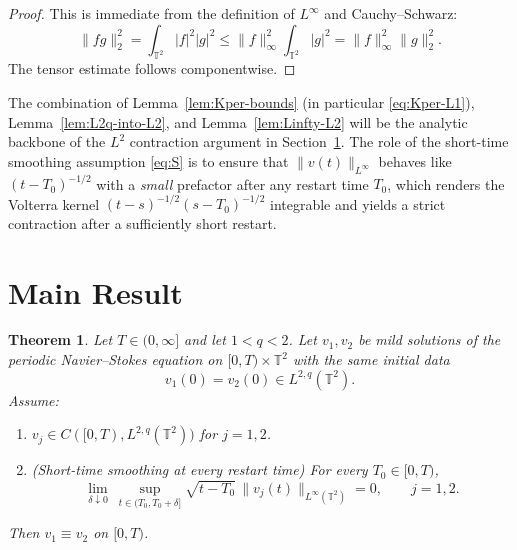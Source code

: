 \documentclass[12pt]{article}
\newcommand{\T}{\mathbb{T}}
\newtheorem{theorem}{Theorem}[section]
\theoremstyle{remark}
\theoremstyle{remark}
\begin{document}
\begin{proof}
This is immediate from the definition of $L^\infty$ and Cauchy--Schwarz:
\[
\|fg\|_2^2=\int_{\T^2}|f|^2|g|^2\le \|f\|_\infty^2\int_{\T^2}|g|^2=\|f\|_\infty^2\|g\|_2^2.
\]
The tensor estimate follows componentwise.
\end{proof}

\medskip

The combination of Lemma~\ref{lem:Kper-bounds} (in particular \eqref{eq:Kper-L1}),
Lemma~\ref{lem:L2q-into-L2}, and Lemma~\ref{lem:Linfty-L2} will be the analytic backbone of the
$L^2$ contraction argument in Section~\ref{sec:main}. The role of the short-time smoothing assumption
\eqref{eq:S} is to ensure that $\|v(t)\|_{L^\infty}$ behaves like $(t-T_0)^{-1/2}$ with a \emph{small}
prefactor after any restart time $T_0$, which renders the Volterra kernel
$(t-s)^{-1/2}(s-T_0)^{-1/2}$ integrable and yields a strict contraction after a sufficiently short restart.


\section{Main Result}\label{sec:main}

\begin{theorem}\label{main}
Let $T\in(0,\infty]$ and let $1<q<2$. Let $v_1,v_2$ be mild solutions of the periodic Navier--Stokes equation on
$[0,T)\times\mathbb T^2$ with the same initial data
\[
v_1(0)=v_2(0)\in L^{2,q}(\mathbb T^2).
\]
Assume:
\begin{enumerate}
\item $v_j\in C([0,T),L^{2,q}(\mathbb T^2))$ for $j=1,2$.
\item (Short-time smoothing at every restart time) For every $T_0\in[0,T)$,
\begin{equation}\label{eq:S}
\lim_{\delta\downarrow 0}\ \sup_{t\in(T_0,T_0+\delta]}
\sqrt{t-T_0}\,\|v_j(t)\|_{L^\infty(\mathbb T^2)}=0,\qquad j=1,2.
\end{equation}
\end{enumerate}
Then $v_1\equiv v_2$ on $[0,T)$.
\end{theorem}
\end{document}
